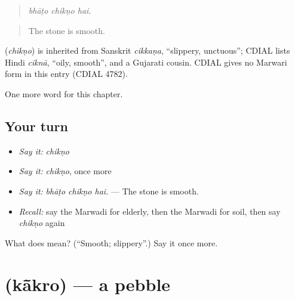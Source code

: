 \begin{quote}
  
\end{quote}

\begin{quote}
\emph{bhāṭo chikṇo hai.}
\end{quote}

\begin{quote}
The stone is smooth.
\end{quote}

\begin{cousinweb}
\textbf{} (\emph{chikṇo}) is inherited from Sanskrit \emph{cikkaṇa}, \textquotedblleft{}slippery, unctuous\textquotedblright{}; CDIAL lists Hindi \emph{ciknā}, \textquotedblleft{}oily, smooth\textquotedblright{}, and a Gujarati cousin. CDIAL gives no Marwari form in this entry (CDIAL 4782).
\end{cousinweb}

\begin{grammarlens}[title={What you've built}]
One more word for this chapter.
\end{grammarlens}

\subsection*{Your turn}
\begin{itemize}
\raggedright
  \item \emph{Say it:} \emph{chikṇo}
  \item \emph{Say it:} \emph{chikṇo}, once more
  \item \emph{Say it:} \emph{bhāṭo chikṇo hai.} — The stone is smooth.
  \item \emph{Recall:} say the Marwadi for elderly, then the Marwadi for soil, then say \emph{chikṇo} again
\end{itemize}

\begin{tcolorbox}[breakable,colback=teal!4,colframe=teal!35!black,title={Before you move on}]
What does  mean? (\textquotedblleft{}Smooth; slippery\textquotedblright{}.) Say it once more.
\end{tcolorbox}
\section[\texorpdfstring{\mw{कांकरो} (kā̃kro)}{कांकरो (kā̃kro)}]{ (kā̃kro) — a pebble}

\label{lesson:MW-C232-kakro}



